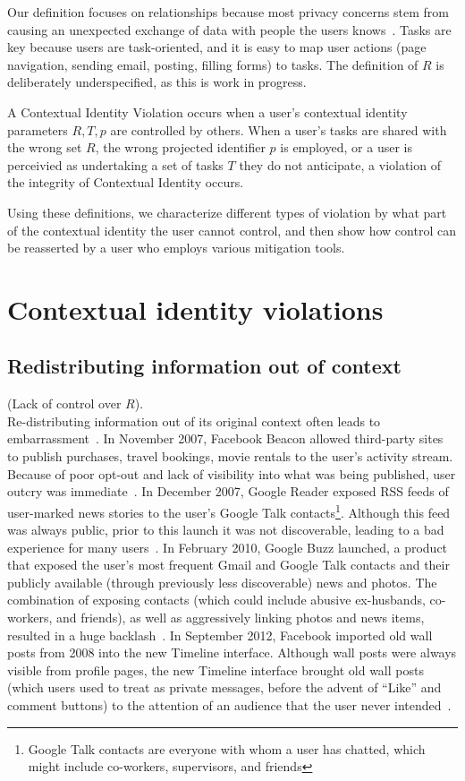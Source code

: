 \documentclass{llncs}
\begin{document}
Our definition focuses on relationships because most privacy concerns stem
from causing an unexpected exchange of data with people the users
knows~\cite{wang}. Tasks are key because users are task-oriented, and it is
easy to map user actions (page navigation, sending email, posting, filling
forms) to tasks.  The definition of $R$ is deliberately underspecified, as this
is work in progress.

\begin{definition}
  A Contextual Identity Violation occurs when a user's contextual identity
parameters $R,T,p$ are controlled by others.  When a user's tasks are shared
with the wrong set $R$, the wrong projected identifier $p$ is employed, or a
user is perceivied as undertaking a set of tasks $T$ they do not anticipate, a
violation of the integrity of Contextual Identity occurs.

\end{definition}

Using these definitions, we characterize different types of violation by what part of the contextual identity the user cannot control, and then show how control can be reasserted by a user who employs various mitigation tools.

\section{Contextual identity violations}
\label{sec:examples}
\subsection{Redistributing information out of context}
(Lack of control over $R$).\\
Re-distributing information out of its original context often leads to
embarrassment~\cite{nissenbaum}.  In November 2007, Facebook Beacon allowed
third-party sites to publish purchases, travel bookings, movie rentals to the
user's activity stream.  Because of poor opt-out and lack of visibility into
what was being published, user outcry was immediate~\cite{mccarthy,nakashima}.
In December 2007, Google Reader exposed RSS feeds of user-marked news stories
to the user's Google Talk contacts\footnote{Google Talk contacts are everyone
with whom a user has chatted, which might include co-workers, supervisors, and
friends}. Although this feed was always public, prior to this launch it was not
discoverable, leading to a bad experience for many users~\cite{helft}. In
February 2010, Google Buzz launched, a product that
exposed the user's most frequent Gmail and Google Talk contacts and their
publicly available (through previously less discoverable) news and photos.  The
combination of exposing contacts (which could include abusive ex-husbands,
co-workers, and friends), as well as aggressively linking photos and news
items, resulted in a huge backlash~\cite{fugitivus,buzz}. In September 2012,
Facebook imported old wall posts from 2008 into the new Timeline interface.
Although wall posts were always visible from profile pages, the new Timeline
interface brought old wall posts (which users used to treat as private
messages, before the advent of ``Like'' and comment buttons) to the attention
of an audience that the user never intended~\cite{timeline}.
\end{document}
